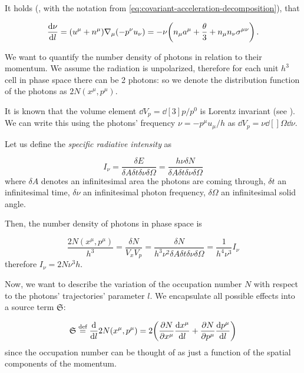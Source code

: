 \documentclass[main.tex]{subfiles}
\begin{document}
It holds (\cite[eq. 2.17]{Thorne:1981feb}, with the notation from \eqref{eq:covariant-acceleration-decomposition}), that

\begin{equation}
  \dv{\nu}{l}  = (u^\mu + n^\mu) \nabla_\mu (-p^\nu u_\nu) = - \nu \qty(n_\mu a^\mu  + \frac{\theta}{3} + n_\mu n_\nu \sigma^{\mu\nu})\,.
\end{equation}

We want to quantify the number density of photons in relation to their momentum. We assume the radiation is unpolarized, therefore for each unit \(h^3\) cell in phase space there can be 2 photons: so we denote the distribution function of the photons as \(2N (x^\mu, p^\mu)\).

It is known that the volume element \(\dd{V}_p = \dd[3]{p} / p^0 \) is Lorentz invariant (see \cite[box 22.5]{MisnerThorneWheeler:1973}).
We can write this using the photons' frequency \(\nu = - p^\mu u_\mu / h\) as \(\dd{V}_p = \nu \dd[]{\Omega} \dd{\nu} \).

Let us define the \emph{specific radiative intensity} as

\begin{equation}
  I_\nu = \frac{\delta E}{\delta A \delta  t \delta \nu \delta \Omega}
  = \frac{h \nu \delta N}{\delta A \delta  t \delta \nu \delta \Omega}
\end{equation}
%
where \(\delta A\) denotes an infinitesimal area the photons are coming through, \(\delta t\) an infinitesimal time, \(\delta \nu\) an infinitesimal photon frequency, \(\delta \Omega\) an infinitesimal solid angle.

Then, the number density of photons in phase space is \cite[figure 22.2]{MisnerThorneWheeler:1973}

\begin{equation}
  \frac{2N(x^\mu, p^\mu)}{h^3} = \frac{\delta N}{V_x V_p} =  \frac{\delta N}{h^3 \nu^2\delta A \delta  t \delta \nu \delta \Omega} = \frac{1}{h^4 \nu^3} I_\nu
\end{equation}
%
therefore \(I_\nu = 2 N \nu^3 h\).

Now, we want to describe the variation of the occupation number \(N\) with respect to the photons' trajectories' parameter \(l\). We encapsulate all possible effects into a source term \(\mathfrak S\):

\begin{equation}
    \mathfrak S \stackrel{\text{def}}{=} \dv{}{l} 2N(x^\mu, p^\mu) =
    2 \qty(\pdv{N}{x^\mu} \dv{x^\mu}{l} + \pdv{N}{p^\mu} \dv{p^\mu}{l}  )
\end{equation}
since the occupation number can be thought of as just a function of the spatial components of the momentum.
\end{document}
